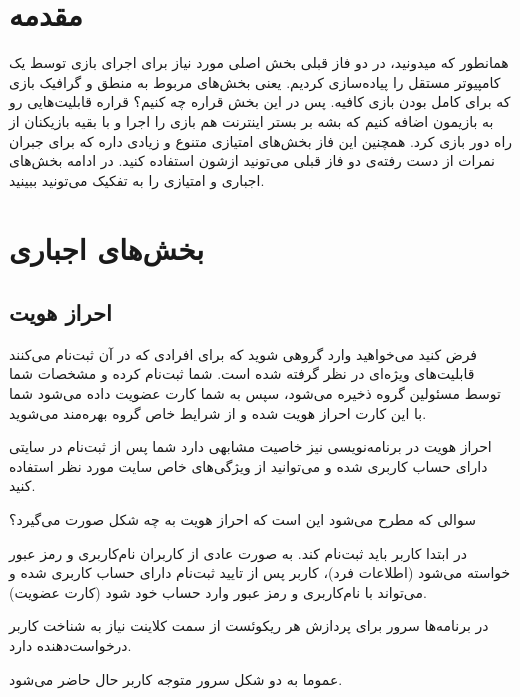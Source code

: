 \documentclass[]{article}
\begin{document}
\newpage

\section*{{\titr مقدمه}}

همانطور که میدونید، در دو فاز قبلی بخش اصلی مورد نیاز برای اجرای بازی توسط یک کامپیوتر مستقل را پیاده‌سازی کردیم. یعنی بخش‌های مربوط به منطق و گرافیک بازی که برای کامل بودن بازی کافیه. پس در این بخش قراره چه کنیم؟ قراره قابلیت‌هایی رو به بازیمون اضافه کنیم که بشه بر بستر اینترنت هم بازی را اجرا و با بقیه بازیکنان از راه دور بازی کرد. همچنین این فاز بخش‌های امتیازی متنوع و زیادی داره که برای جبران نمرات از دست‌ رفته‌ی دو فاز قبلی می‌تونید ازشون استفاده کنید. در ادامه بخش‌های اجباری و امتیازی را به تفکیک می‌تونید ببینید.

\section*{{\titr بخش‌های اجباری}}

\subsection*{{\titr احراز هویت}}

فرض کنید می‌خواهید وارد گروهی شوید که برای افرادی که در آن ثبت‌نام می‌کنند قابلیت‌های ویژه‌ای در نظر گرفته شده است. شما ثبت‌نام کرده و مشخصات شما توسط مسئولین گروه ذخیره می‌شود، سپس به شما کارت عضویت داده می‌شود شما با این کارت احراز هویت شده و از شرایط خاص گروه بهره‌مند می‌شوید.

احراز هویت در برنامه‌نویسی نیز خاصیت مشابهی دارد شما پس از ثبت‌نام در سایتی دارای حساب کاربری شده و می‌توانید از ویژگی‌های خاص سایت مورد نظر استفاده کنید.

سوالی که مطرح می‌شود این است که احراز هویت به چه شکل صورت می‌گیرد؟

در ابتدا کاربر باید ثبت‌نام کند. به صورت عادی از کاربران نام‌کاربری و رمز عبور خواسته می‌شود (اطلاعات فرد)، کاربر پس از تایید ثبت‌نام دارای حساب کاربری شده و می‌تواند با نام‌کاربری و رمز عبور وارد حساب خود شود (کارت عضویت).

در برنامه‌‌ها سرور برای پردازش هر ریکوئست از سمت کلاینت نیاز به شناخت کاربر درخواست‌دهنده دارد.

عموما به دو شکل سرور متوجه کاربر حال حاضر می‌شود.
\end{document}
